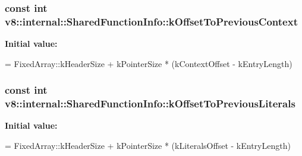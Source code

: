 \subsubsection[{\texorpdfstring{k\+Offset\+To\+Previous\+Context}{kOffsetToPreviousContext}}]{\setlength{\rightskip}{0pt plus 5cm}const int v8\+::internal\+::\+Shared\+Function\+Info\+::k\+Offset\+To\+Previous\+Context\hspace{0.3cm}{\ttfamily [static]}}\hypertarget{classv8_1_1internal_1_1_shared_function_info_aec9d3b1b9a10bf97ae0790b75b882a72}{}\label{classv8_1_1internal_1_1_shared_function_info_aec9d3b1b9a10bf97ae0790b75b882a72}
{\bfseries Initial value\+:}
\begin{DoxyCode}
=
      FixedArray::kHeaderSize + kPointerSize * (kContextOffset - kEntryLength)
\end{DoxyCode}
\subsubsection[{\texorpdfstring{k\+Offset\+To\+Previous\+Literals}{kOffsetToPreviousLiterals}}]{\setlength{\rightskip}{0pt plus 5cm}const int v8\+::internal\+::\+Shared\+Function\+Info\+::k\+Offset\+To\+Previous\+Literals\hspace{0.3cm}{\ttfamily [static]}}\hypertarget{classv8_1_1internal_1_1_shared_function_info_a367eed75cc37822b583e16a557b3a670}{}\label{classv8_1_1internal_1_1_shared_function_info_a367eed75cc37822b583e16a557b3a670}
{\bfseries Initial value\+:}
\begin{DoxyCode}
=
      FixedArray::kHeaderSize + kPointerSize * (kLiteralsOffset - kEntryLength)
\end{DoxyCode}
